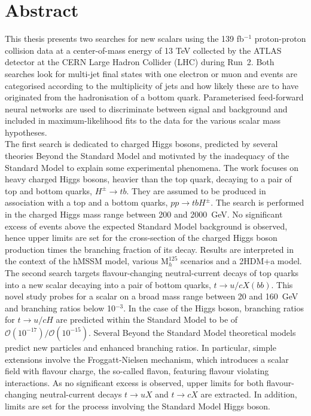 \chapter*{Abstract}

This thesis presents two searches for new scalars using the 139 fb$^{-1}$ proton-proton collision data at a center-of-mass energy of 13 TeV collected by the ATLAS detector at the CERN Large Hadron Collider (LHC) during Run~2. Both searches look for multi-jet final states with one electron or muon and events are categorised according to the multiplicity of jets and how likely these are to have originated from the hadronisation of a bottom quark. Parameterised feed-forward neural networks are used to discriminate between signal and background and included in maximum-likelihood fits to the data for the various scalar mass hypotheses.\\

The first search is dedicated to charged Higgs bosons, predicted by several theories Beyond the Standard Model and motivated by the inadequacy of the Standard Model to explain some experimental phenomena. The work focuses on heavy charged Higgs bosons, heavier than the top quark, decaying to a pair of top and bottom quarks, $H^\pm\to tb$. They are assumed to be produced in association with a top and a bottom quarks, $pp\to tbH^\pm$. The search is performed in the charged Higgs mass range between 200 and 2000~GeV. No significant excess of events above the expected Standard Model background is observed, hence upper limits are set for the cross-section of the charged Higgs boson production times the branching fraction of its decay. Results are interpreted in the context of the hMSSM model, various $\text{M}_h^{125}$ scenarios and a 2HDM+a model.\\

The second search targets flavour-changing neutral-current decays of top quarks into a new scalar decaying into a pair of bottom quarks, $t \to u/c X(bb)$. This novel study probes for a scalar on a broad mass range between 20 and 160~GeV and branching ratios below 10$^{-3}$. In the case of the Higgs boson, branching ratios for $t \to u/c H$ are predicted within the Standard Model to be of $\mathcal{O}(10^{-17})/\mathcal{O}(10^{-15})$. Several Beyond the Standard Model theoretical models predict new particles and enhanced branching ratios. In particular, simple extensions involve the Froggatt-Nielsen mechanism, which introduces a scalar field with flavour charge, the so-called flavon, featuring flavour violating interactions. As no significant excess is observed, upper limits for both flavour-changing neutral-current decays $t\to uX$ and $t\to cX$ are extracted. In addition, limits are set for the process involving the Standard Model Higgs boson.
